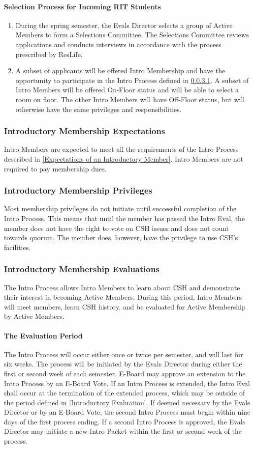 \documentclass{article}
\newcommand{\asubsection}[1]{\subsubsection{#1} \label{#1}}
\newcommand{\asubsubsection}[1]{\paragraph{#1} \label{#1}}
\begin{document}
\asubsubsection{Selection Process for Incoming RIT Students}
\begin{enumerate}
	\item During the spring semester, the Evals Director selects a group of Active Members to form a Selections Committee.
	      The Selections Committee reviews applications and conducts interviews in accordance with the process prescribed by ResLife.
	\item A subset of applicants will be offered Intro Membership and have the opportunity to participate in the Intro Process defined in \ref{The Evaluation Period}.
	      A subset of Intro Members will be offered On-Floor status and will be able to select a room on floor.
	      The other Intro Members will have Off-Floor status, but will otherwise have the same privileges and responsibilities.
\end{enumerate}

\asubsection{Introductory Membership Expectations}
Intro Members are expected to meet all the requirements of the Intro Process described in \ref{Expectations of an Introductory Member}.
Intro Members are not required to pay membership dues.

\asubsection{Introductory Membership Privileges}
Most membership privileges do not initiate until successful completion of the Intro Process.
This means that until the member has passed the Intro Eval, the member does not have the right to vote on CSH issues and does not count towards quorum.
The member does, however, have the privilege to use CSH's facilities.

\asubsection{Introductory Membership Evaluations}
The Intro Process allows Intro Members to learn about CSH and demonstrate their interest in becoming Active Members. During this period, Intro Members will meet members, learn CSH history, and be evaluated for Active Membership by Active Members.

\asubsubsection{The Evaluation Period}
The Intro Process will occur either once or twice per semester, and will last for six weeks.
The process will be initiated by the Evals Director during either the first or second week of each semester. E-Board may approve an extension to the Intro Process by an E-Board Vote.
If an Intro Process is extended, the Intro Eval shall occur at the termination of the extended process, which may be outside of the period defined in \ref{Introductory Evaluation}.
If deemed necessary by the Evals Director or by an E-Board Vote, the second Intro Process must begin within nine days of the first process ending.
If a second Intro Process is approved, the Evals Director may initiate a new Intro Packet within the first or second week of the process.
\end{document}

